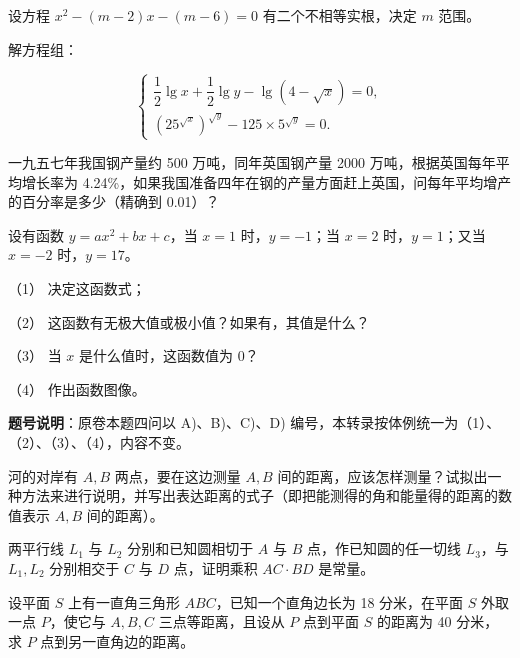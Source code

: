 

\begin{question}
设方程 $x^{2}-(m-2)x-(m-6)=0$ 有二个不相等实根，决定 $m$ 范围。

\end{question}
\begin{question}
解方程组：

\nopagebreak[4]
\[
\begin{cases}
\dfrac12\lg x+\dfrac12\lg y-\lg(4-\sqrt{x})=0,\\[2pt]
\left(25^{\sqrt{x}}\right)^{\sqrt{y}}-125\times5^{\sqrt{y}}=0.
\end{cases}
\]

\end{question}
\begin{question}
一九五七年我国钢产量约 500 万吨，同年英国钢产量 2000 万吨，根据英国每年平均增长率为 4.24\%，如果我国准备四年在钢的产量方面赶上英国，问每年平均增产的百分率是多少（精确到 0.01）？

\end{question}
\begin{question}
设有函数 $y=ax^{2}+bx+c$，当 $x=1$ 时，$y=-1$；当 $x=2$ 时，$y=1$；又当 $x=-2$ 时，$y=17$。

（1） 决定这函数式；

（2） 这函数有无极大值或极小值？如果有，其值是什么？

（3） 当 $x$ 是什么值时，这函数值为 $0$？

（4） 作出函数图像。

\begin{gktip}
\textbf{题号说明}：原卷本题四问以 A)、B)、C)、D) 编号，本转录按体例统一为（1）、（2）、（3）、（4），内容不变。
\end{gktip}

\end{question}
\begin{question}
河的对岸有 $A,B$ 两点，要在这边测量 $A,B$ 间的距离，应该怎样测量？试拟出一种方法来进行说明，并写出表达距离的式子（即把能测得的角和能量得的距离的数值表示 $A,B$ 间的距离）。

\Needspace{0.4\textheight}
\end{question}
\begin{question}
两平行线 $L_1$ 与 $L_2$ 分别和已知圆相切于 $A$ 与 $B$ 点，作已知圆的任一切线 $L_3$，与 $L_1,L_2$ 分别相交于 $C$ 与 $D$ 点，证明乘积 $AC\cdot BD$ 是常量。
\nopagebreak[4]
\begin{center}\end{center}
\nopagebreak[4]
\end{question}
\begin{question}
设平面 $S$ 上有一直角三角形 $ABC$，已知一个直角边长为 18 分米，在平面 $S$ 外取一点 $P$，使它与 $A,B,C$ 三点等距离，且设从 $P$ 点到平面 $S$ 的距离为 40 分米，求 $P$ 点到另一直角边的距离。

\end{question}